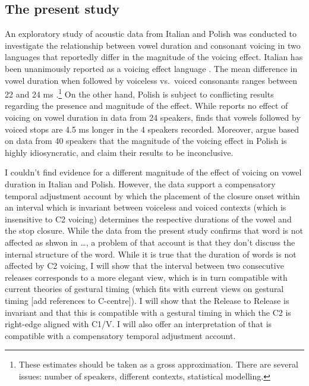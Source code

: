 \documentclass[]{JASAnew}
\begin{document}
\hypertarget{the-present-study}{%
\subsection{The present study}\label{the-present-study}}

An exploratory study of acoustic data from Italian and Polish was
conducted to investigate the relationship between vowel duration and
consonant voicing in two languages that reportedly differ in the
magnitude of the voicing effect. Italian has been unanimously reported
as a voicing effect language
\citep{caldognetto1979, farnetani1986, esposito2002}. The mean
difference in vowel duration when followed by voiceless vs.~voiced
consonants ranges between 22 and 24 ms \citep[with longer vowels
followed by voiced
consonants,][]{farnetani1986, esposito2002}.\footnote{These estimates should be taken as a gross approximation.
There are several issues: number of speakers, different contexts, statistical modelling.}
On the other hand, Polish is subject to conflicting results regarding
the presence and magnitude of the effect. While \citet{keating1984}
reports no effect of voicing on vowel duration in data from 24 speakers,
\citet{nowak2006} finds that vowels followed by voiced stops are 4.5 ms
longer in the 4 speakers recorded. Moreover, \citet{malisz2008} argue
based on data from 40 speakers that the magnitude of the voicing effect
in Polish is highly idiosyncratic, and claim their results to be
inconclusive.

I couldn't find evidence for a different magnitude of the effect of
voicing on vowel duration in Italian and Polish. However, the data
support a compensatory temporal adjustment account by which the
placement of the closure onset within an interval which is invariant
between voiceless and voiced contexts (which is insensitive to C2
voicing) determines the respective durations of the vowel and the stop
closure. While the data from the present study confirms that word is not
affected as shwon in \ldots{}, a problem of that account is that they
don't discuss the internal structure of the word. While it is true that
the duration of words is not affected by C2 voicing, I will show that
the interval between two consecutive releases corresponds to a more
elegant view, which is in turn compatible with current theories of
gestural timing (which fits with current views on gestural timing {[}add
references to C-centre{]}). I will show that the Release to Release is
invariant and that this is compatible with a gestural timing in which
the C2 is right-edge aligned with C1/V. I will also offer an
interpretation of \citet{maddieson1976} that is compatible with a
compensatory temporal adjustment account.
\end{document}
